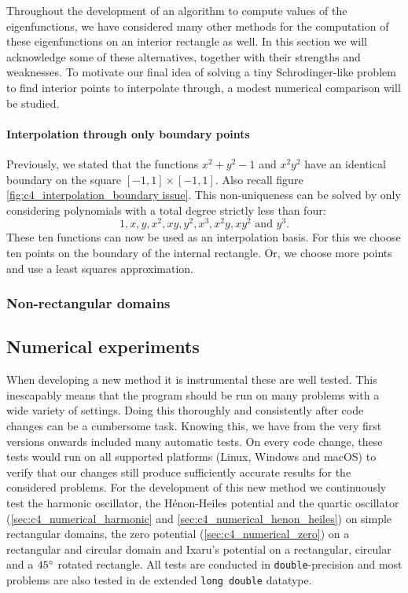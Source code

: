 Throughout the development of an algorithm to compute values of the eigenfunctions, we have considered many other methods for the computation of these eigenfunctions on an interior rectangle as well. In this section we will acknowledge some of these alternatives, together with their strengths and weaknesses. To motivate our final idea of solving a tiny Schrodinger-like problem to find interior points to interpolate through, a modest numerical comparison will be studied.

\paragraph{Interpolation through only boundary points} Previously, we stated that the functions $x^2 + y^2 - 1$ and $x^2 y^2$ have an identical boundary on the square $[-1, 1] \times [-1, 1]$. Also recall figure \ref{fig:c4_interpolation_boundary issue}. This non-uniqueness can be solved by only considering polynomials with a total degree strictly less than four:
$$
    1, x, y, x^2, xy, y^2, x^3, x^2 y, x y^2 \text{ and } y^3\text{.}
$$
These ten functions can now be used as an interpolation basis. For this we choose ten points on the boundary of the internal rectangle. Or, we choose more points and use a least squares approximation.




\subsubsection{Non-rectangular domains}


\subsection{Numerical experiments}

When developing a new method it is instrumental these are well tested. This inescapably means that the program should be run on many problems with a wide variety of settings. Doing this thoroughly and consistently after code changes can be a cumbersome task. Knowing this, we have from the very first versions onwards included many automatic tests. On every code change, these tests would run on all supported platforms (Linux, Windows and macOS) to verify that our changes still produce sufficiently accurate results for the considered problems. For the development of this new method we continuously test the harmonic oscillator, the Hénon-Heiles potential and the quartic oscillator (\ref{sec:c4_numerical_harmonic} and \ref{sec:c4_numerical_henon_heiles}) on simple rectangular domains, the zero potential (\ref{sec:c4_numerical_zero}) on a rectangular and circular domain and Ixaru's potential on a rectangular, circular and a $45\degree$ rotated rectangle. All tests are conducted in \texttt{double}-precision and most problems are also tested in de extended \texttt{long double} datatype.

